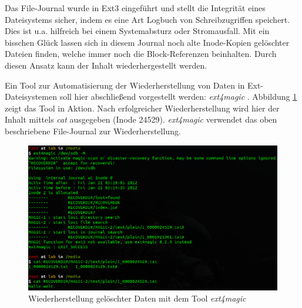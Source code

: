 Das File-Journal wurde in Ext3 eingeführt und stellt die Integrität eines Dateisystems sicher, indem es eine Art Logbuch von Schreibzugriffen speichert. Dies ist u.a. hilfreich bei einem Systemabsturz oder Stromausfall. Mit ein bisschen Glück lassen sich in diesem Journal noch alte Inode-Kopien gelöschter Dateien finden, welche immer noch die Block-Referenzen beinhalten. Durch diesen Ansatz kann der Inhalt wiederhergestellt werden.

Ein Tool zur Automatisierung der Wiederherstellung von Daten in Ext-Dateisystemen soll hier abschließend vorgestellt werden: \textit{ext4magic} \cite{Ext4magic.07.01.2022}.
Abbildung \ref{fig:ext4magic} zeigt das Tool in Aktion. Nach erfolgreicher Wiederherstellung wird hier der Inhalt mittels \textit{cat} ausgegeben (Inode 24529). \textit{ext4magic} verwendet das oben beschriebene File-Journal zur Wiederherstellung.

\begin{figure}[H]
	\centering
	\includegraphics[width=12cm,keepaspectratio=true]{pictures/ext4magic-recovery.png}
	\caption{
		Wiederherstellung gelöschter Daten mit dem Tool \textit{ext4magic} \cite{Ext4magic.07.01.2022}
	}
	\label{fig:ext4magic}
\end{figure}